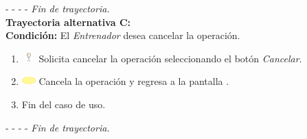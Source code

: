 - - - - \textit{Fin de trayectoria.} \\

\textbf{\large{Trayectoria alternativa C:}}\\
\textbf{Condición: } El \textit{Entrenador} desea cancelar la operación.

\begin{enumerate}
	\item \includegraphics[width=15pt, height=10pt]{./Figuras/iconosCU/usuario.png} Solicita cancelar la operación seleccionando el botón \textit{Cancelar}.
	\item \includegraphics[width=15pt]{./Figuras/iconosCU/herramienta.png} Cancela la operación y regresa a la pantalla .
	\item Fin del caso de uso.
\end{enumerate}


- - - - \textit{Fin de trayectoria.} \\
\clearpage